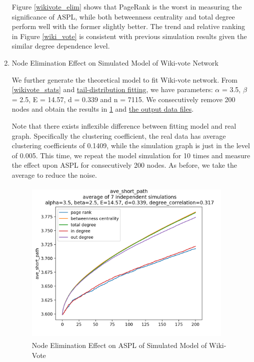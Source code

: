 \documentclass{article}
\begin{document}
\begin{enumerate}
\par Figure \ref{wikivote_elim} shows that PageRank is the worst in measuring the significance of ASPL, while both betweenness centrality and total degree perform well with the former slightly better. The trend and relative ranking in Figure \ref{wiki_vote} is consistent with previous simulation results given the similar degree dependence level. \\ 

\item Node Elimination Effect on Simulated Model of Wiki-vote Network\\

\par We further generate the theoretical model to fit Wiki-vote network. From \ref{wikivote_stats} and \hyperlink{powerlaw_fit}{tail-distribution fitting}, we have parameters:  $\alpha$ = 3.5, $\beta$ = 2.5,  E = 14.57, d = 0.339 and n = 7115.  We consecutively remove 200 nodes and obtain the results in \ref{wikisim} and \href{https://github.com/leahwu/DCM_simulaiton_and_analysis/tree/master/output_data/models3_wiki_vote_simulation}{the output data files}.
\par Note that there exists inflexible difference between fitting model and real graph. Specifically the clustering coefficient, the real data has average clustering coefficients of 0.1409, while the simulation graph is just in the level of 0.005. This time, we repeat the model simulation for 10 times and measure the effect upon ASPL for consecutively 200 nodes. As before, we take the average to reduce the noise. 

\begin{figure}[!htbp]
\label{wikisim}
\centering\includegraphics[width=10cm, height=8cm]{final_images/wikisim.png}
\caption{Node Elimination Effect on ASPL of Simulated Model of Wiki-Vote}
\end{figure}


\end{enumerate}
\end{document}
